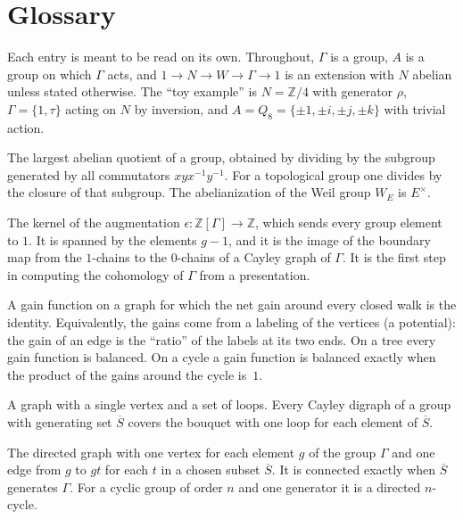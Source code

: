 \documentclass[12pt,letterpaper]{article}
\numberwithin{equation}{section}
\theoremstyle{plain}
\theoremstyle{definition}
\newcommand{\Z}{\mathbb{Z}}
\DeclareMathOperator{\Cay}{Cay}
\begin{document}
\section*{Glossary}

Each entry is meant to be read on its own. Throughout, $\Gamma$ is a
group, $A$ is a group on which $\Gamma$ acts, and $1\to N\to W\to\Gamma\to1$
is an extension with $N$ abelian unless stated otherwise. The ``toy example'' is $N=\Z/4$ with
generator $\rho$, $\Gamma=\{1,\tau\}$ acting on $N$ by inversion, and
$A=Q_8=\{\pm1,\pm i,\pm j,\pm k\}$ with trivial action.

\begin{description}[itemsep=3pt,leftmargin=1.5em,style=unboxed]
\item[Abelianization.] The largest abelian quotient of a group, obtained
by dividing by the subgroup generated by all commutators $xyx^{-1}y^{-1}$.
For a topological group one divides by the closure of that subgroup. The
abelianization of the Weil group $W_E$ is $E^\times$.

\item[Augmentation ideal.] The kernel of the augmentation
$\epsilon:\Z[\Gamma]\to\Z$, which sends every group element to $1$. It is
spanned by the elements $g-1$, and it is the image of the boundary map
from the $1$-chains to the $0$-chains of a Cayley graph of $\Gamma$. It is
the first step in computing the cohomology of $\Gamma$ from a
presentation.

\item[Balanced gain function.] A gain function on a graph for which the
net gain around every closed walk is the identity. Equivalently, the gains
come from a labeling of the vertices (a potential): the gain of an edge is
the ``ratio'' of the labels at its two ends. On a tree every gain function
is balanced. On a cycle a gain function is balanced exactly when the
product of the gains around the cycle is~$1$.

\item[Bouquet.] A graph with a single vertex and a set of loops. Every
Cayley digraph of a group with generating set $\overline{S}$ covers the
bouquet with one loop for each element of $\overline{S}$.

\item[Cayley digraph $\Cay(\Gamma,\overline{S})$.] The directed graph with
one vertex for each element $g$ of the group $\Gamma$ and one edge from
$g$ to $gt$ for each $t$ in a chosen subset $\overline{S}$. It is connected
exactly when $\overline{S}$ generates $\Gamma$. For a cyclic group of
order $n$ and one generator it is a directed $n$-cycle.


\end{description}
\end{document}

